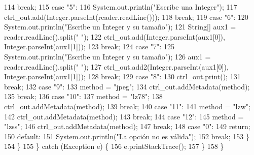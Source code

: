 \begin{DoxyCode}
114                     \textcolor{keywordflow}{break};
115                     \textcolor{keywordflow}{case} \textcolor{stringliteral}{"5"}:
116                         System.out.println(\textcolor{stringliteral}{"Escribe una Integer"});
117                         ctrl\_out.add(Integer.parseInt(reader.readLine()));
118                     \textcolor{keywordflow}{break};
119                     \textcolor{keywordflow}{case} \textcolor{stringliteral}{"6"}:
120                         System.out.println(\textcolor{stringliteral}{"Escribe un Integer y su tamaño"});
121                         String[] aux1 = reader.readLine().split(\textcolor{stringliteral}{" "});
122                         ctrl\_out.add(Integer.parseInt(aux1[0]), Integer.parseInt(aux1[1]));
123                     \textcolor{keywordflow}{break};
124                     \textcolor{keywordflow}{case} \textcolor{stringliteral}{"7"}:
125                         System.out.println(\textcolor{stringliteral}{"Escribe un Integer y su tamaño"});
126                         aux1 = reader.readLine().split(\textcolor{stringliteral}{" "});
127                         ctrl\_out.add2(Integer.parseInt(aux1[0]), Integer.parseInt(aux1[1]));
128                     \textcolor{keywordflow}{break};
129                     \textcolor{keywordflow}{case} \textcolor{stringliteral}{"8"}:
130                         ctrl\_out.print();
131                     \textcolor{keywordflow}{break};
132                     \textcolor{keywordflow}{case} \textcolor{stringliteral}{"9"}:
133                         method = \textcolor{stringliteral}{"jpeg"};
134                         ctrl\_out.addMetadata(method);
135                     \textcolor{keywordflow}{break};
136                     \textcolor{keywordflow}{case} \textcolor{stringliteral}{"10"}:
137                         method = \textcolor{stringliteral}{"lz78"};
138                         ctrl\_out.addMetadata(method);
139                     \textcolor{keywordflow}{break};
140                     \textcolor{keywordflow}{case} \textcolor{stringliteral}{"11"}:
141                         method = \textcolor{stringliteral}{"lzw"};
142                         ctrl\_out.addMetadata(method);
143                     \textcolor{keywordflow}{break};
144                     \textcolor{keywordflow}{case} \textcolor{stringliteral}{"12"}:
145                         method = \textcolor{stringliteral}{"lzss"};
146                         ctrl\_out.addMetadata(method);
147                     \textcolor{keywordflow}{break};
148                     \textcolor{keywordflow}{case} \textcolor{stringliteral}{"0"}:
149                         \textcolor{keywordflow}{return};
150                     \textcolor{keywordflow}{default}:
151                         System.out.println(\textcolor{stringliteral}{"La opción no es válida"});
152                     \textcolor{keywordflow}{break};
153                 \}
154             \}
155         \} \textcolor{keywordflow}{catch} (Exception e) \{
156             e.printStackTrace();
157         \}
158     \}
\end{DoxyCode}
